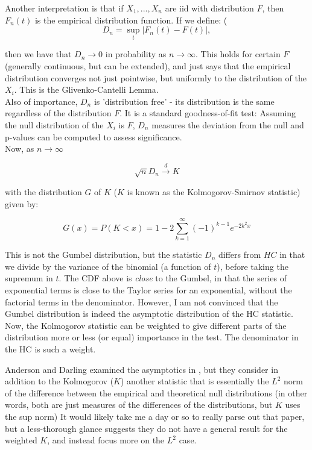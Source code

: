 \documentclass[11pt]{article}
\begin{document}
Another interpretation is that if $X_1,...,X_n$ are iid with distribution $F$, then $F_n(t)$ is the empirical distribution function. If we define:
(
$$D_n = \sup_{t}\left|F_n(t) - F(t)\right|,$$

then we have that $D_n \rightarrow 0$ in probability as $n\rightarrow \infty$. This holds for certain $F$ (generally continuous, but can be extended), and just says that the empirical distribution converges not just pointwise, but uniformly to the distribution of the $X_i$. This is the Glivenko-Cantelli Lemma.  \\

Also of importance, $D_n$ is 'distribution free' - its distribution is the same regardless of the distribution $F$. It is a standard goodness-of-fit test: Assuming the null distribution of the $X_i$ is $F$, $D_n$ measures the deviation from the null and p-values can be computed to assess significance.\\

Now, as $n\rightarrow\infty$

$$\sqrt{n}D_n \xrightarrow{d} K$$

with the distribution $G$ of $K$ ($K$ is known as the Kolmogorov-Smirnov statistic) given by:

$$G(x) = P(K<x) = 1 - 2\sum_{k=1}^\infty (-1)^{k-1}e^{-2k^2x}$$

This is not the Gumbel distribution, but the statistic $D_n$ differs from $HC$ in that we divide by the variance of the binomial (a function of $t$), before taking the supremum in $t$. The CDF above is \emph{close} to the Gumbel, in that the series of exponential terms is close to the Taylor series for an exponential, without the factorial terms in the denominator. However, I am not convinced that the Gumbel distribution is indeed the asymptotic distribution of the HC statistic. \\

Now, the Kolmogorov statistic can be weighted to give different parts of the distribution more or less (or equal) importance in the test. The denominator in the HC is such a weight.  

Anderson and Darling examined the asymptotics in \cite{AD}, but they consider in addition to the Kolmogorov ($K$) another statistic that is essentially the $L^2$ norm of the difference between the empirical and theoretical null distributions (in other words, both are just measures of the differences of the distributions, but $K$ uses the sup norm) It would likely take me a day or so to really parse out that paper, but a less-thorough glance suggests they do not have a general result for the weighted $K$, and instead focus more on the $L^2$ case.  
\end{document}
